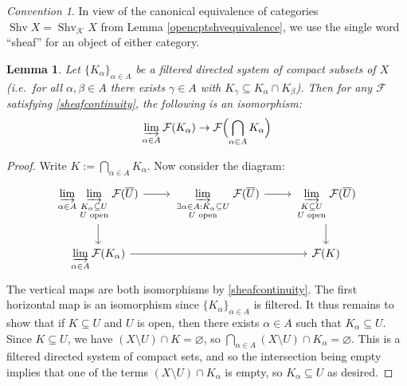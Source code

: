 \documentclass[12pt]{article}
\newtheorem{lemma}[theorem]{Lemma}
\theoremstyle{definition}
\theoremstyle{remark}
\newtheorem{convention}[theorem]{Convention}
\numberwithin{equation}{subsection}
\newcommand{\F}{\mathcal F}
\newcommand{\K}{\mathcal K}
\newcommand{\Shv}{\operatorname{Shv}}
\begin{document}
\begin{convention}
In view of the canonical equivalence of categories $\Shv X=\Shv_\K X$ from Lemma \ref{opencptshvequivalence}, we use the single word ``sheaf'' for an object of either category.
\end{convention}

\begin{lemma}\label{anycompactintersectionworksSH}
Let $\{K_\alpha\}_{\alpha\in A}$ be a filtered directed system of compact subsets of $X$ (i.e.\ for all $\alpha,\beta\in A$ there exists $\gamma\in A$ with $K_\gamma\subseteq K_\alpha\cap K_\beta$).  Then for any $\F$ satisfying \eqref{sheafcontinuity}, the following is an isomorphism:
\begin{equation}
\varinjlim_{\alpha\in A}\F(K_\alpha)\to\F\Bigl(\bigcap_{\alpha\in A}K_\alpha\Bigr)
\end{equation}
\end{lemma}

\begin{proof}
Write $K:=\bigcap_{\alpha\in A}K_\alpha$.  Now consider the diagram:
\begin{equation}
\begin{tikzcd}
\varinjlim\limits_{\alpha\in A}\varinjlim\limits_{\begin{smallmatrix}K_\alpha\subseteq U\cr U\textrm{ open}\end{smallmatrix}}\F(\overline U)\ar{r}\ar{d}&
\varinjlim\limits_{\begin{smallmatrix}\exists\alpha\in A:K_\alpha\subseteq U\cr U\textrm{ open}\end{smallmatrix}}\F(\overline U)\ar{r}&
\varinjlim\limits_{\begin{smallmatrix}K\subseteq U\cr U\textrm{ open}\end{smallmatrix}}\F(\overline U)\ar{d}\\
\varinjlim\limits_{\alpha\in A}\F(K_\alpha)\ar{rr}&&\F(K)
\end{tikzcd}
\end{equation}
The vertical maps are both isomorphisms by \eqref{sheafcontinuity}.  The first horizontal map is an isomorphism since $\{K_\alpha\}_{\alpha\in A}$ is filtered.  It thus remains to show that if $K\subseteq U$ and $U$ is open, then there exists $\alpha\in A$ such that $K_\alpha\subseteq U$.  Since $K\subseteq U$, we have $(X\setminus U)\cap K=\varnothing$, so $\bigcap_{\alpha\in A}(X\setminus U)\cap K_\alpha=\varnothing$.  This is a filtered directed system of compact sets, and so the intersection being empty implies that one of the terms $(X\setminus U)\cap K_\alpha$ is empty, so $K_\alpha\subseteq U$ as desired.
\end{proof}
\end{document}
